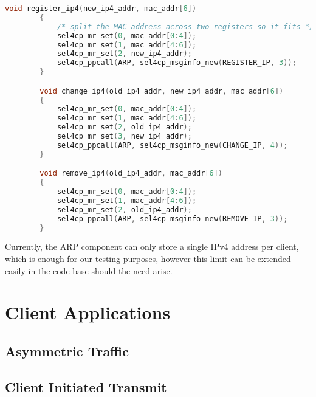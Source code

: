 \begin{minipage}{\textwidth}
    \centering
    \begin{lstlisting}[tabsize=2, language=C, caption={Client Interface to ARP Component},frame=tb, 
                        label={l:queues2}, captionpos=b]
        void register_ip4(new_ip4_addr, mac_addr[6])
        {
            /* split the MAC address across two registers so it fits */
            sel4cp_mr_set(0, mac_addr[0:4]);
            sel4cp_mr_set(1, mac_addr[4:6]);
            sel4cp_mr_set(2, new_ip4_addr);
            sel4cp_ppcall(ARP, sel4cp_msginfo_new(REGISTER_IP, 3));
        }

        void change_ip4(old_ip4_addr, new_ip4_addr, mac_addr[6])
        {
            sel4cp_mr_set(0, mac_addr[0:4]);
            sel4cp_mr_set(1, mac_addr[4:6]);
            sel4cp_mr_set(2, old_ip4_addr);
            sel4cp_mr_set(3, new_ip4_addr);
            sel4cp_ppcall(ARP, sel4cp_msginfo_new(CHANGE_IP, 4));
        }

        void remove_ip4(old_ip4_addr, mac_addr[6])
        {
            sel4cp_mr_set(0, mac_addr[0:4]);
            sel4cp_mr_set(1, mac_addr[4:6]);
            sel4cp_mr_set(2, old_ip4_addr);
            sel4cp_ppcall(ARP, sel4cp_msginfo_new(REMOVE_IP, 3));
        }
    \end{lstlisting}
\end{minipage}

Currently, the ARP component can only store a single IPv4 address per client, which
is enough for our testing purposes, however this limit can be extended easily in the code
base should the need arise.


\section{Client Applications}

\subsection{Asymmetric Traffic}
\subsection{Client Initiated Transmit}
